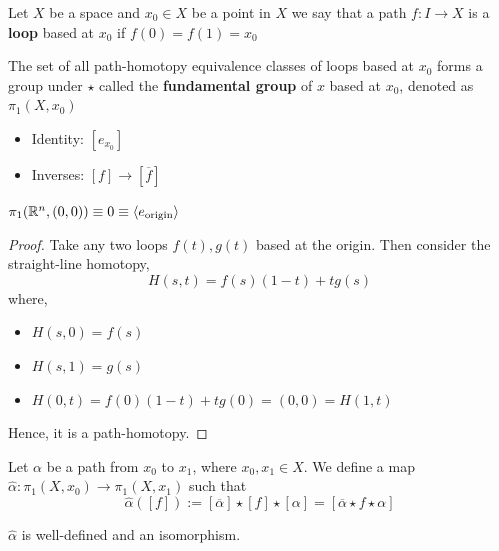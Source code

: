 \documentclass[12pt]{amsart}
\begin{document}
\begin{definition}
    Let $X$ be a space and $x_0 \in X$ be a point in $X$ we say that a path $f: I \to X$ is a \textbf{loop} based at $x_0$ if $f(0) = f(1) = x_0$
\end{definition}

\begin{definition}
    The set of all path-homotopy equivalence classes of loops based at $x_0$ forms a group under $\star$ called the \textbf{fundamental group} of $x$ based at $x_0$, denoted as $\pi_1(X, x_0)$

    \begin{itemize}
        \item Identity: $[e_{x_0}]$
        \item Inverses: $[f] \to [\overline{f}]$
    \end{itemize}

    \begin{example}
        $\pi_1(\mathbb R^n, (0,0)) \equiv 0  \equiv \langle e_{\text{origin}} \rangle$
        \begin{proof}
        Take any two loops $f(t), g(t)$ based at the origin. Then consider the straight-line homotopy,
        \[H(s,t) = f(s) (1-t) + tg(s)\]
        where, 
        \begin{itemize}
            \item $H(s, 0) = f(s)$
            \item $H(s, 1) = g(s)$
            \item $H(0, t) = f(0)(1-t) + tg(0) = (0,0)  = H(1, t)$
        \end{itemize}
        Hence, it is a path-homotopy. 
    \end{proof}
    \end{example}
\end{definition}

\begin{definition}
    Let $\alpha$ be a path from $x_0$ to $x_1$, where $x_0, x_1 \in X$. We define a map $\widehat{\alpha}: \pi_1 (X, x_0) \to \pi_1(X, x_1)$ such that 
    \[\widehat{\alpha}([f]) := [\overline{\alpha}] \star [f] \star [\alpha] =[\overline{\alpha}\star f \star \alpha]  \]
\end{definition}
\begin{proposition}
    $\widehat{\alpha}$ is well-defined and an isomorphism. 
\end{proposition}
\end{document}

